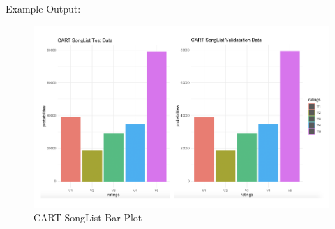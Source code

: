 \documentclass{article}
\begin{document}
Example Output:
\begin{figure}[ht]
\centering
\includegraphics[scale=0.3]{CART SongList Bar Plot.png}
\caption{CART SongList Bar Plot}
\label{fig:universe}
\end{figure}
\end{document}
